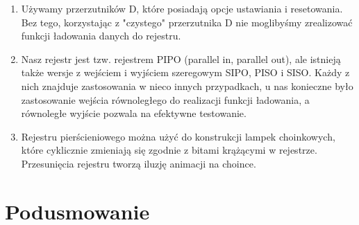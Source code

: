 \documentclass[12pt,a4paper,openright]{mwrep}
\begin{document}
    \begin{enumerate}
        \item Używamy przerzutników D, które posiadają opcje ustawiania i resetowania. Bez tego, korzystając
        z "czystego" przerzutnika D nie moglibyśmy zrealizować funkcji ładowania danych do rejestru. 
        
        \item Nasz rejestr jest tzw. rejestrem PIPO (parallel in, parallel out), ale istnieją także wersje
        z wejściem i wyjściem szeregowym SIPO, PISO i SISO. Każdy z nich znajduje zastosowania w nieco innych 
        przypadkach, u nas konieczne było zastosowanie wejścia równoległego do realizacji funkcji ładowania, a 
        równoległe wyjście pozwala na efektywne testowanie.

        \item Rejestru pierścieniowego można użyć do konstrukcji lampek choinkowych, które cyklicznie zmieniają
        się zgodnie z bitami krążącymi w rejestrze. Przesunięcia rejestru tworzą iluzję animacji na choince.
        
    \end{enumerate}

\section{Podusmowanie}
\end{document}
